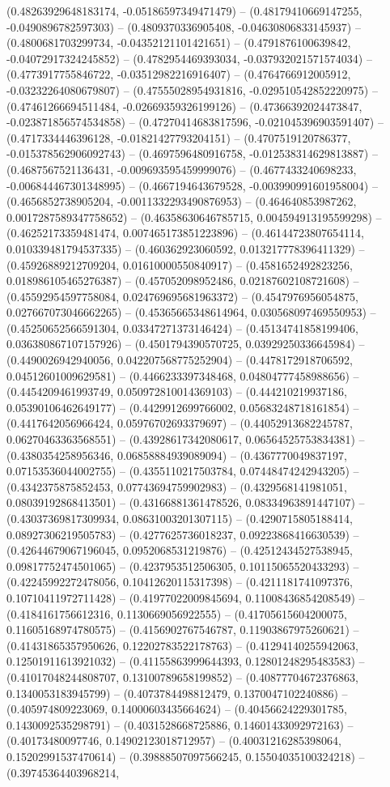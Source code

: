 (0.48263929648183174, -0.05186597349471479) -- (0.48179410669147255, -0.0490896782597303) -- (0.4809370336905408, -0.04630806833145937) -- (0.4800681703299734, -0.04352121101421651) -- (0.4791876100639842, -0.04072917324245852) -- (0.4782954469393034, -0.037932021571574034) -- (0.4773917755846722, -0.03512982216916407) -- (0.4764766912005912, -0.03232264080679807) -- (0.47555028954931816, -0.029510542852220975) -- (0.47461266694511484, -0.02669359326199126) -- (0.47366392024473847, -0.023871856574534858) -- (0.47270414683817596, -0.021045396903591407) -- (0.4717334446396128, -0.01821427793204151) -- (0.4707519120786377, -0.015378562906092743) -- (0.4697596480916758, -0.012538314629813887) -- (0.4687567521136431, -0.009693595459999076) -- (0.4677433240698233, -0.006844467301348995) -- (0.4667194643679528, -0.003990991601958004) -- (0.4656852738905204, -0.0011332293490876953) -- (0.464640853987262, 0.0017287589347758652) -- (0.46358630646785715, 0.004594913195599298) -- (0.46252173359481474, 0.007465173851223896) -- (0.46144723807654114, 0.010339481794537335) -- (0.460362923060592, 0.013217778396411329) -- (0.45926889212709204, 0.01610000550840917) -- (0.4581652492823256, 0.018986105465276387) -- (0.457052098952486, 0.02187602108721608) -- (0.45592954597758084, 0.024769695681963372) -- (0.4547976956054875, 0.027667073046662265) -- (0.45365665348614964, 0.030568097469550953) -- (0.45250652566591304, 0.03347271373146424) -- (0.45134741858199406, 0.036380867107157926) -- (0.4501794390570725, 0.03929250336645984) -- (0.4490026942940056, 0.042207568775252904) -- (0.4478172918706592, 0.04512601009629581) -- (0.4466233397348468, 0.04804777458988656) -- (0.4454209461993749, 0.050972810014369103) -- (0.444210219937186, 0.05390106462649177) -- (0.4429912699766002, 0.05683248718161854) -- (0.4417642056966424, 0.05976702693379697) -- (0.44052913682245787, 0.06270463363568551) -- (0.43928617342080617, 0.06564525753834381) -- (0.4380354258956346, 0.06858884939089094) -- (0.4367770049837197, 0.07153536044002755) -- (0.4355110217503784, 0.07448474242943205) -- (0.4342375875852453, 0.07743694759902983) -- (0.4329568141981051, 0.08039192868413501) -- (0.43166881361478526, 0.08334963891447107) -- (0.43037369817309934, 0.08631003201307115) -- (0.4290715805188414, 0.08927306219505783) -- (0.4277625736018237, 0.09223868416630539) -- (0.42644679067196045, 0.0952068531219876) -- (0.42512434527538945, 0.09817752474501065) -- (0.4237953512506305, 0.10115065520433293) -- (0.42245992272478056, 0.10412620115317398) -- (0.4211181741097376, 0.10710411972711428) -- (0.41977022009845694, 0.11008436854208549) -- (0.4184161756612316, 0.1130669056922555) -- (0.41705615604200075, 0.11605168974780575) -- (0.4156902767546787, 0.11903867975260621) -- (0.41431865357950626, 0.12202783522178763) -- (0.41294140255942063, 0.12501911613921032) -- (0.41155863999644393, 0.12801248295483583) -- (0.41017048244808707, 0.13100789658199852) -- (0.40877704672376863, 0.1340053183945799) -- (0.4073784498812479, 0.1370047102240886) -- (0.405974809223069, 0.14000603435664624) -- (0.40456624229301785, 0.1430092535298791) -- (0.4031528668725886, 0.14601433092972163) -- (0.40173480097746, 0.14902123018712957) -- (0.40031216285398064, 0.15202991537470614) -- (0.39888507097566245, 0.15504035100324218) -- (0.39745364403968214, 